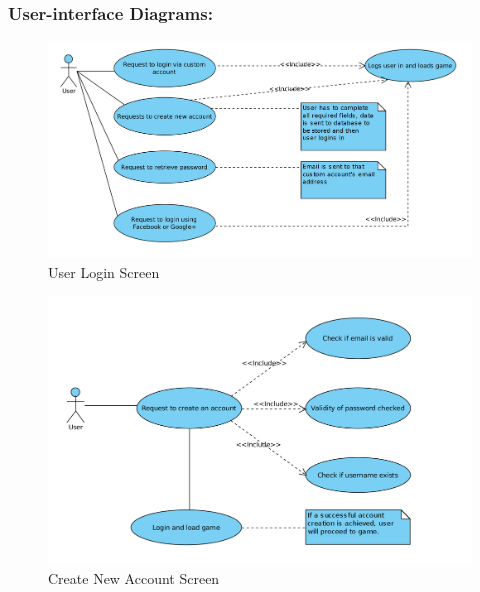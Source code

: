 \documentclass[letterpaper]{article}
\begin{document}
				\vspace{0.2in}
				\subsubsection*{User-interface Diagrams:}
				\vspace{0.2in}
				
					\begin{figure}[H]
					\centering
					\includegraphics[width=140mm]{UML_Diagram/Use_Case/User_Login.jpg}
					\caption{User Login Screen}
					\end{figure}
				
					\begin{figure}[H]
					\centering
					\includegraphics[width=140mm]{UML_Diagram/Use_Case/CreatAccount_UseCase.jpg}
					\caption{Create New Account Screen}
					\end{figure}
				
\end{document}
